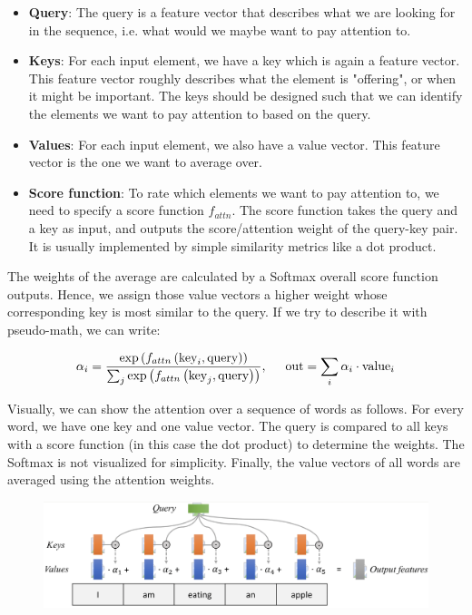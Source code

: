 \begin{itemize}
    \item \textbf{Query}: The query is a feature vector that describes what we are looking for in the sequence, i.e. what would we maybe want to pay attention to.
    \item \textbf{Keys}: For each input element, we have a key which is again a feature vector. This feature vector roughly describes what the element is "offering", or when it might be important. The keys should be designed such that we can identify the elements we want to pay attention to based on the query.
    \item \textbf{Values}: For each input element, we also have a value vector. This feature vector is the one we want to average over.
    \item  \textbf{Score function}: To rate which elements we want to pay attention to, we need to specify a score function $f_{attn}$. The score function takes the query and a key as input, and outputs the score/attention weight of the query-key pair. It is usually implemented by simple similarity metrics like a dot product.
\end{itemize}


The weights of the average are calculated by a Softmax overall score function outputs. Hence, we assign those value vectors a higher weight whose corresponding key is most similar to the query.
If we try to describe it with pseudo-math, we can write:

$$
\alpha_i = \frac{\exp\left(f_{attn}\left(\text{key}_i, \text{query}\right)\right)}{\sum_j \exp\left(f_{attn}\left(\text{key}_j, \text{query}\right)\right)}, \hspace{5mm} \text{out} = \sum_i \alpha_i \cdot \text{value}_i
$$

Visually, we can show the attention over a sequence of words as follows.
For every word, we have one key and one value vector. The query is compared to all keys with a score function (in this case the dot product) to determine the weights. The Softmax is not visualized for simplicity. Finally, the value vectors of all words are averaged using the attention weights.
 
\begin{figure}[ht]
    \centering
    \includegraphics[scale=0.17,trim=0cm 0cm 0.6cm 0cm,clip=true]{figures/attention_example.png}
\end{figure}




